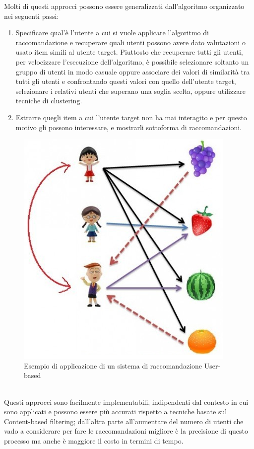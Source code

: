 Molti di questi approcci possono essere generalizzati dall'algoritmo organizzato nei seguenti passi:
\begin{enumerate}
	\item Specificare qual'è l'utente a cui si vuole applicare l'algoritmo di raccomandazione e recuperare quali utenti possono 
	avere dato valutazioni o usato item simili al utente target. Piuttosto che recuperare tutti gli utenti, per velocizzare l'esecuzione
	dell'algoritmo, è possibile selezionare soltanto un gruppo di utenti in modo casuale oppure associare dei valori di similarità tra 
	tutti gli utenti e confrontando questi valori con quello dell'utente target, selezionare i relativi utenti che superano una soglia
	scelta, oppure utilizzare tecniche di clustering.
	\item Estrarre quegli item a cui l'utente target non ha mai interagito e per questo motivo gli possono interessare, e mostrarli 
	sottoforma di raccomandazioni.
\end{enumerate}

\begin{figure}[ht!]
	\centering
	\includegraphics[scale=0.5]{images/UB_CF_ex.png}
	\caption{Esempio di applicazione di un sistema di raccomandazione User-based}
	\label{fig:UB_CF}
\end{figure}
\ \\
Questi approcci sono facilmente implementabili, indipendenti dal contesto in cui sono applicati e possono essere più accurati rispetto
a tecniche basate sul Content-based filtering; dall'altra parte all'aumentare del numero di utenti che vado a considerare per fare le 
raccomandazioni migliore è la precisione di questo processo ma anche è maggiore il costo in termini di tempo.\\  

